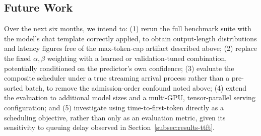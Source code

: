 \subsection{Future Work}
\label{subsec:future-work}

Over the next six months, we intend to: (1) rerun the full benchmark suite
with the model's chat template correctly applied, to obtain output-length
distributions and latency figures free of the max-token-cap artifact
described above; (2) replace the fixed $\alpha, \beta$ weighting with a
learned or validation-tuned combination, potentially conditioned on the
predictor's own confidence; (3) evaluate the composite scheduler under a
true streaming arrival process rather than a pre-sorted batch, to remove the
admission-order confound noted above; (4) extend the evaluation to
additional model sizes and a multi-GPU, tensor-parallel serving
configuration; and (5) investigate using time-to-first-token directly as a
scheduling objective, rather than only as an evaluation metric, given its
sensitivity to queuing delay observed in Section~\ref{subsec:results-ttft}.
